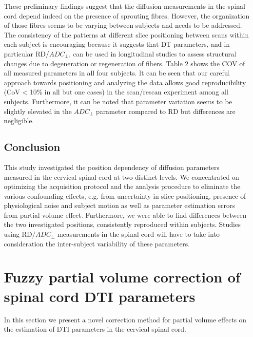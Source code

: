 These preliminary findings suggest that the diffusion measurements in the spinal cord depend indeed on the presence of sprouting fibres. However, the organization of those fibres seems to be varying between subjects and needs to be addressed. The consistency of the patterns at different slice positioning between scans within each subject is encouraging because it suggests that DT parameters, and in particular RD/$ADC_\perp$, can be used in longitudinal studies to assess structural changes due to degeneration or regeneration of fibers. Table 2 shows the COV of all measured parameters in all four subjects. It can be seen that our careful approach towards positioning and analyzing the data allows good reproducibility (CoV < 10$\%$ in all but one cases) in the scan/rescan experiment among all subjects. Furthermore, it can be noted that parameter variation seems to be slightly elevated in the $ADC_\perp$ parameter compared to RD but differences are negligible.

\subsection*{Conclusion}
This study investigated the position dependency of diffusion parameters measured in the cervical spinal cord at two distinct levels. We concentrated on optimizing the acquisition protocol and the analysis procedure to eliminate the various confounding effects, e.g. from uncertainty in slice positioning, presence of physiological noise and subject motion as well as parameter estimation errors from partial volume effect. Furthermore, we were able to find differences between the two investigated positions, consistently reproduced within subjects. Studies using RD/$ADC_\perp$ measurements in the spinal cord will have to take into consideration the inter-subject variability of these parameters.
 
\section{Fuzzy partial volume correction of spinal cord DTI parameters}
In this section we present a novel correction method for partial volume effects on the estimation of DTI parameters in the cervical spinal cord.
